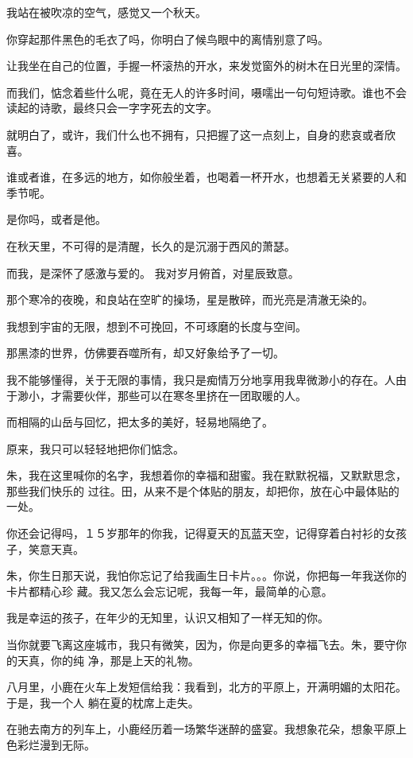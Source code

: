 \documentclass[12pt,a4paper]{article}
\def\blankrev{\vspace{1ex}}									%
\begin{document}
		我站在被吹凉的空气，感觉又一个秋天。\par
		你穿起那件黑色的毛衣了吗，你明白了候鸟眼中的离情别意了吗。

		让我坐在自己的位置，手握一杯滚热的开水，来发觉窗外的树木在日光里的深情。\par
		而我们，惦念着些什么呢，竟在无人的许多时间，嗫嚅出一句句短诗歌。谁也不会读起的诗歌，最终只会一字字死去的文字。\par
		就明白了，或许，我们什么也不拥有，只把握了这一点刻上，自身的悲哀或者欣喜。\par
		谁或者谁，在多远的地方，如你般坐着，也喝着一杯开水，也想着无关紧要的人和季节呢。\par
		是你吗，或者是他。\par
		在秋天里，不可得的是清醒，长久的是沉溺于西风的萧瑟。

		而我，是深怀了感激与爱的。
		我对岁月俯首，对星辰致意。\par
		那个寒冷的夜晚，和良站在空旷的操场，星是散碎，而光亮是清澈无染的。

		我想到宇宙的无限，想到不可挽回，不可琢磨的长度与空间。\par
		那黑漆的世界，仿佛要吞噬所有，却又好象给予了一切。\par
		我不能够懂得，关于无限的事情，我只是痴情万分地享用我卑微渺小的存在。人由于渺小，才需要伙伴，那些可以在寒冬里挤在一团取暖的人。\par
		而相隔的山岳与回忆，把太多的美好，轻易地隔绝了。\par
		原来，我只可以轻轻地把你们惦念。


		\blankrev
		朱，我在这里喊你的名字，我想着你的幸福和甜蜜。我在默默祝福，又默默思念，那些我们快乐的
	过往。田，从来不是个体贴的朋友，却把你，放在心中最体贴的一处。

		你还会记得吗，１５岁那年的你我，记得夏天的瓦蓝天空，记得穿着白衬衫的女孩子，笑意天真。

		朱，你生日那天说，我怕你忘记了给我画生日卡片。。。你说，你把每一年我送你的卡片都精心珍
	藏。我又怎么会忘记呢，我每一年，最简单的心意。

		我是幸运的孩子，在年少的无知里，认识又相知了一样无知的你。

		当你就要飞离这座城市，我只有微笑，因为，你是向更多的幸福飞去。朱，要守你的天真，你的纯
	净，那是上天的礼物。


		\blankrev
		八月里，小鹿在火车上发短信给我：我看到，北方的平原上，开满明媚的太阳花。于是，我一个人
	躺在夏的枕席上走失。

		在驰去南方的列车上，小鹿经历着一场繁华迷醉的盛宴。我想象花朵，想象平原上色彩烂漫到无际。
\end{document}
